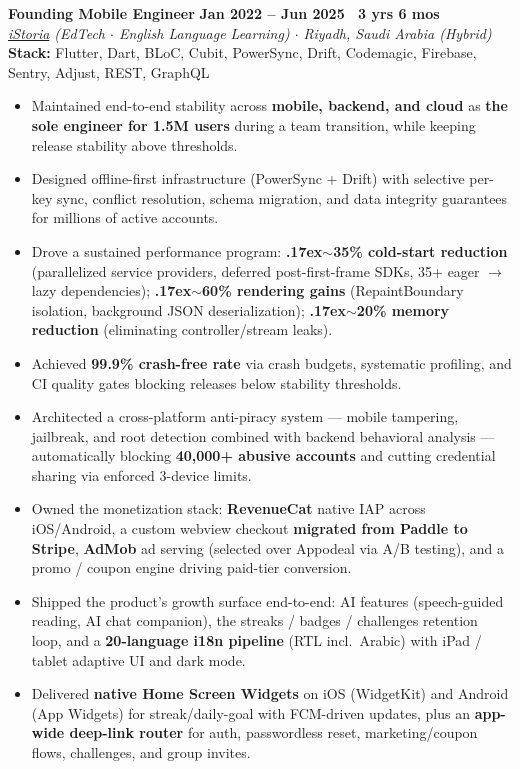 \documentclass[10pt,a4paper]{article}
\newcommand{\workexp}[5]{
    \noindent \textbf{#1} \hfill \textbf{#2} \\
    \textit{#3} \\
    {\small\color{techstack}\textbf{Stack:} #4}
    \vspace{0pt}
    \begin{itemize}[itemsep=2.4pt,parsep=0pt,topsep=2pt,leftmargin=1.5em]
    #5
    \end{itemize}
    \vspace{3pt}
}
\begin{document}
    \workexp{Founding Mobile Engineer}{Jan 2022 -- Jun 2025 \textbullet\ 3 yrs 6 mos}
    {\href{https://istoria.app/en/}{iStoria} (EdTech $\cdot$ English Language Learning) $\cdot$ Riyadh, Saudi Arabia (Hybrid)}
    {Flutter, Dart, BLoC, Cubit, PowerSync, Drift, Codemagic, Firebase, Sentry, Adjust, REST, GraphQL}
    {
        \item Maintained end-to-end stability across \textbf{mobile, backend, and cloud} as \textbf{the sole engineer for 1.5M users} during a team transition, while keeping release stability above thresholds.
    \item Designed offline-first infrastructure (PowerSync + Drift) with selective per-key sync, conflict resolution, schema migration, and data integrity guarantees for millions of active accounts.
    \item Drove a sustained performance program: \textbf{{\raise.17ex\hbox{$\scriptstyle\sim$}}35\% cold-start reduction} (parallelized service providers, deferred post-first-frame SDKs, 35+ eager $\to$ lazy dependencies); \textbf{{\raise.17ex\hbox{$\scriptstyle\sim$}}60\% rendering gains} (RepaintBoundary isolation, background JSON deserialization); \textbf{{\raise.17ex\hbox{$\scriptstyle\sim$}}20\% memory reduction} (eliminating controller/stream leaks).
    \item Achieved \textbf{99.9\% crash-free rate} via crash budgets, systematic profiling, and CI quality gates blocking releases below stability thresholds.
    \item Architected a cross-platform anti-piracy system --- mobile tampering, jailbreak, and root detection combined with backend behavioral analysis --- automatically blocking \textbf{40,000+ abusive accounts} and cutting credential sharing via enforced 3-device limits.
    \item Owned the monetization stack: \textbf{RevenueCat} native IAP across iOS/Android, a custom webview checkout \textbf{migrated from Paddle to Stripe}, \textbf{AdMob} ad serving (selected over Appodeal via A/B testing), and a promo / coupon engine driving paid-tier conversion.
    \item Shipped the product's growth surface end-to-end: AI features (speech-guided reading, AI chat companion), the streaks / badges / challenges retention loop, and a \textbf{20-language i18n pipeline} (RTL incl.\ Arabic) with iPad / tablet adaptive UI and dark mode.
    \item Delivered \textbf{native Home Screen Widgets} on iOS (WidgetKit) and Android (App Widgets) for streak/daily-goal with FCM-driven updates, plus an \textbf{app-wide deep-link router} for auth, passwordless reset, marketing/coupon flows, challenges, and group invites.
}
\end{document}
